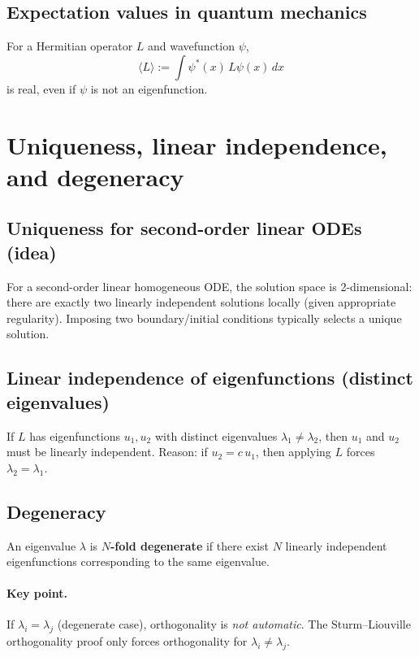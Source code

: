 \subsection{Expectation values in quantum mechanics}
For a Hermitian operator $L$ and wavefunction $\psi$,
\begin{equation}
\langle L\rangle := \int \psi^*(x)\,L\psi(x)\,dx
\end{equation}
is real, even if $\psi$ is not an eigenfunction.


\section{Uniqueness, linear independence, and degeneracy}

\subsection{Uniqueness for second-order linear ODEs (idea)}
For a second-order linear homogeneous ODE, the solution space is 2-dimensional:
there are exactly two linearly independent solutions locally (given appropriate regularity).
Imposing two boundary/initial conditions typically selects a unique solution.

\subsection{Linear independence of eigenfunctions (distinct eigenvalues)}
If $L$ has eigenfunctions $u_1,u_2$ with distinct eigenvalues $\lambda_1\neq\lambda_2$,
then $u_1$ and $u_2$ must be linearly independent.
Reason: if $u_2=c\,u_1$, then applying $L$ forces $\lambda_2=\lambda_1$.

\subsection{Degeneracy}
An eigenvalue $\lambda$ is \textbf{$N$-fold degenerate} if there exist $N$ linearly independent
eigenfunctions corresponding to the same eigenvalue.

\paragraph{Key point.}
If $\lambda_i=\lambda_j$ (degenerate case), orthogonality is \emph{not automatic}.
The Sturm--Liouville orthogonality proof only forces orthogonality for
$\lambda_i\neq \lambda_j$.

